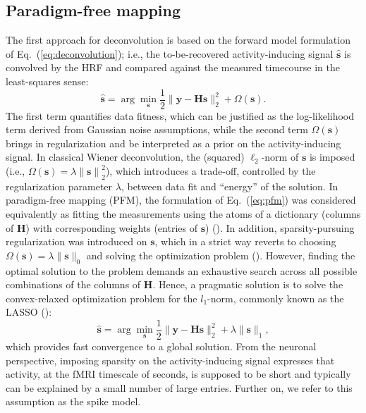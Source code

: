 
\subsection{Paradigm-free mapping}
The first approach for deconvolution is based on the forward model formulation of Eq.~(\ref{eq:deconvolution}); i.e., the to-be-recovered activity-inducing signal $\hat{\mathbf{s}}$ is convolved by the HRF and compared against the measured timecourse in the least-squares sense: 
\begin{equation}
    \label{eq:pfm}
    \hat{\mathbf{s}} = \arg \min_{\mathbf{s}} \frac{1}{2} \| \mathbf{y} - \mathbf{Hs} \|_2^2 + \Omega(\mathbf{s}).
\end{equation}
The first term quantifies data fitness, which can be justified as the log-likelihood term derived from Gaussian noise assumptions, while the second term \(\Omega(\mathbf{s})\) brings in regularization and be interpreted as a prior on the activity-inducing signal. In classical Wiener deconvolution, the (squared) $\ell_2$-norm of $\mathbf{s}$ is imposed (i.e., $\Omega(\mathbf{s})=\lambda \left\| \mathbf{s}\right\|_2^2$), which introduces a trade-off, controlled by the regularization parameter $\lambda$, between data fit and ``energy'' of the solution. In paradigm-free mapping (PFM), the formulation of Eq.~(\ref{eq:pfm}) was considered equivalently as fitting the measurements using the atoms of a dictionary (columns of $\mathbf{H}$) with corresponding weights (entries of $\mathbf{s}$) (\citealt{gaudes2011DetectionCharacterizationSingletrial,caballerogaudes2013ParadigmFreeMapping,urunuela2020StabilityBasedSparseParadigm}). 
In addition, sparsity-pursuing regularization was introduced on $\mathbf{s}$, which in a strict way reverts to choosing \(\Omega(\mathbf{s})=\lambda \| \mathbf{s} \|_0\) and solving the optimization problem (\citealt{bruckstein2009SparseSolutionsSystems}). However, finding the optimal solution to the problem demands an exhaustive search across all possible combinations of the columns of \(\mathbf{H}\). Hence, a  pragmatic solution is to solve the convex-relaxed optimization problem for the \(l_1\)-norm, commonly known as the LASSO (\citealt{tibshirani1996RegressionShrinkageSelection}): 
\begin{equation}
    \label{eq:pfm_spike}
    \hat{\mathbf{s}} = \arg \min_{\mathbf{s}} \frac{1}{2} \| \mathbf{y} - \mathbf{Hs} \|_2^2 + \lambda \| \mathbf{s} \|_1,
\end{equation}
which provides fast convergence to a global solution. From the neuronal perspective, imposing sparsity on the activity-inducing signal expresses that activity, at the fMRI timescale of seconds, is supposed to be short and typically can be explained by a small number of large entries. Further on, we refer to this assumption as the spike model. 

